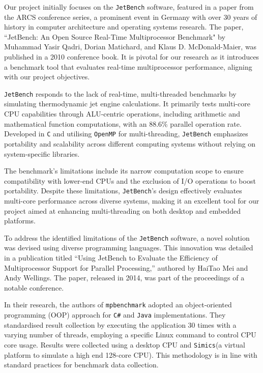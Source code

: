 Our project initially focuses on the \texttt{JetBench} software, featured in a paper from the ARCS conference series, a prominent event in Germany with over 30 years of history in computer architecture and operating systems research. The paper, ``JetBench: An Open Source Real-Time Multiprocessor Benchmark" by Muhammad Yasir Qadri, Dorian Matichard, and Klaus D. McDonald-Maier, was published in a 2010 conference book\cite{JetBench_paper}. It is pivotal for our research as it introduces a benchmark tool that evaluates real-time multiprocessor performance, aligning with our project objectives.

\texttt{JetBench} responds to the lack of real-time, multi-threaded benchmarks by simulating thermodynamic jet engine calculations. It primarily tests multi-core CPU capabilities through ALU-centric operations, including arithmetic and mathematical function computations, with an 88.6\% parallel operation rate. Developed in \texttt{C} and utilising \texttt{OpenMP} for multi-threading, \texttt{JetBench} emphasizes portability and scalability across different computing systems without relying on system-specific libraries.

The benchmark's limitations include its narrow computation scope to ensure compatibility with lower-end CPUs and the exclusion of I/O operations to boost portability. Despite these limitations, \texttt{JetBench}'s design effectively evaluates multi-core performance across diverse systems, making it an excellent tool for our project aimed at enhancing multi-threading on both desktop and embedded platforms.


To address the identified limitations of the \texttt{JetBench} software, a novel solution was devised using diverse programming languages. This innovation was detailed in a publication titled ``Using JetBench to Evaluate the Efficiency of Multiprocessor Support for Parallel Processing,'' authored by HaiTao Mei and Andy Wellings. The paper, released in 2014, was part of the proceedings of a notable conference\cite{mpbenchmark_paper}.

In their research, the authors of \texttt{mpbenchmark}\cite{mpbenchmark_paper} adopted an object-oriented programming (OOP) approach for \texttt{C\#} and \texttt{Java} implementations. They standardised result collection by executing the application 30 times with a varying number of threads, employing a specific Linux command to control CPU core usage. Results were collected using a desktop CPU and \texttt{Simics}(a virtual platform to simulate a high end 128-core CPU).  This methodology is in line with standard practices for benchmark data collection.

